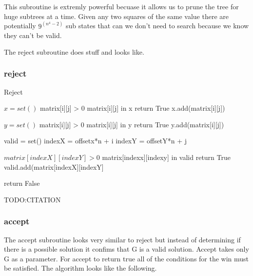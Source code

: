 \documentclass{sig-alternate}
\begin{document}
This subroutine is extremly powerful becuase it allows us to prune the tree for huge subtrees at a time. Given any two squares of the same value there are potentially $9^(n^4 - 2)$ sub states that can we don't need to search because we know they can't be valid. 

The reject subroutine does stuff and looks like.
\subsubsection{reject}
\begin{algorithm}
\caption{Reject}\label{reject}
\begin{algorithmic}[1]

\State $x = set()$
\If matrix[i][j] > 0
\If matrix[i][j] in x
\State return True
\EndIf
\State x.add(matrix[i][j])
\EndIf
\EndFor

\State $y = set()$
\If matrix[i][j] > 0
\If matrix[i][j] in y
\State return True
\EndIf
\State y.add(matrix[i][j])
\EndIf
\EndFor

\State valid = set()
    \State indexX = offsetx*n + i
    \State indexY = offsetY*n + j

    \If $matrix[indexX][indexY] > 0$
    \If matrix[indexx][indexy] in valid 
    \State return True
    \EndIf
    \State valid.add(matrix[indexX][indexY]
    \EndIf
    
    \EndFor
    \EndFor
\EndFor
\EndFor
\State return False
\EndProcedure
\end{algorithmic}
\end{algorithm}
TODO:CITATION

\subsubsection{accept}
The accept subroutine looks very similar to reject but instead of determining if there is a possible solution it confims that G is a valid solution. Accept takes only G as a parameter. For accept to return true all of the conditions for the win must be satisfied. The algorithm looks like the following.
\end{document}
